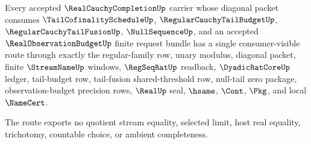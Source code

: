 \begin{theorem}
\label{thm:real-cauchy-completion-tail-schedule-budget-exhaustion}
Every accepted $\RealCauchyCompletionUp$ carrier whose diagonal packet consumes $\TailCofinalityScheduleUp$, $\RegularCauchyTailBudgetUp$, $\RegularCauchyTailFusionUp$, $\NullSequenceUp$, and an accepted $\RealObservationBudgetUp$ finite request bundle has a single consumer-visible route through exactly the regular-family row, unary modulus, diagonal packet, finite $\StreamNameUp$ windows, $\RegSeqRatUp$ readback, $\DyadicRatCoreUp$ ledger, tail-budget row, tail-fusion shared-threshold row, null-tail zero package, observation-budget precision rows, $\RealUp$ seal, $\hsame$, $\Cont$, $\Pkg$, and local $\NameCert$.

The route exports no quotient stream equality, selected limit, host real equality, trichotomy, countable choice, or ambient completeness.
\end{theorem}
